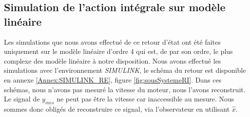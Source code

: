 		\subsection{Simulation de l'action intégrale sur modèle linéaire}
		Les simulations que nous avons effectué de ce retour d'état ont été faites uniquement sur le modèle linéaire d'ordre 4 qui est, de par son ordre, le plus complexe des modèle linéaire à notre disposition. Nous avons effectué les simulations avec l'environnement \emph{SIMULINK}, le schéma du retour est disponible en annexe \ref{Annex:SIMULINK_RE}, figure \ref{fig:sousSystemeRI}. Dans ces schémas, nous n'avons pas mesuré la vitesse du moteur, nous l'avons reconstruit. Le signal de $y_{mes}$ ne peut pas être la vitesse car inaccessible au mesure. Nous sommes donc obligés de reconstruire ce signal, via l'observateur en utilisant $\hat{x}$.	 
		

